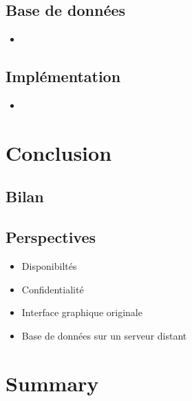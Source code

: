 \documentclass{beamer}
\begin{document}
\subsection{Base de données}

\begin{frame}
    \begin{itemize}
        \item{}
    \end{itemize}  
\end{frame}

\subsection{Implémentation}
\begin{frame}
  \begin{itemize}
      \item{}
  \end{itemize}
\end{frame}

\section{Conclusion}

\subsection{Bilan}



\subsection{Perspectives}
\begin{frame}
  \begin{itemize}
      \item{Disponibiltés}
      \item{Confidentialité}
      \item{Interface graphique originale}
      \item{Base de données sur un serveur distant}
  \end{itemize}
\end{frame}

\section*{Summary}
\end{document}
